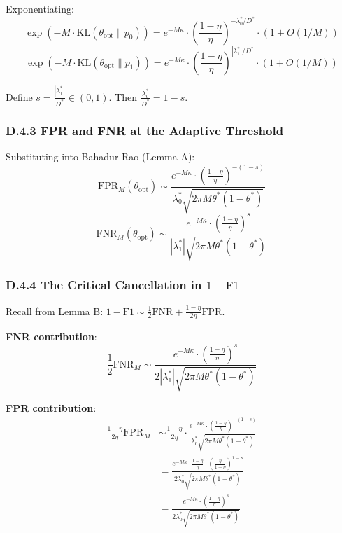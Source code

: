 \documentclass[
  12pt,
]{article}
\begin{document}
Exponentiating:
\[\exp(-M \cdot \text{KL}(\theta_{\text{opt}} \| p_0)) = e^{-M\kappa} \cdot \left(\frac{1-\eta}{\eta}\right)^{-\lambda_0^*/D^*} \cdot (1 + O(1/M))\]
\[\exp(-M \cdot \text{KL}(\theta_{\text{opt}} \| p_1)) = e^{-M\kappa} \cdot \left(\frac{1-\eta}{\eta}\right)^{|\lambda_1^*|/D^*} \cdot (1 + O(1/M))\]

Define \(s = \frac{|\lambda_1^*|}{D^*} \in (0,1)\). Then
\(\frac{\lambda_0^*}{D^*} = 1-s\).

\subsubsection{D.4.3 FPR and FNR at the Adaptive
Threshold}\label{d.4.3-fpr-and-fnr-at-the-adaptive-threshold}

Substituting into Bahadur-Rao (Lemma A):
\[\text{FPR}_M(\theta_{\text{opt}}) \sim \frac{e^{-M\kappa} \cdot \left(\frac{1-\eta}{\eta}\right)^{-(1-s)}}{\lambda_0^* \sqrt{2\pi M \theta^*(1-\theta^*)}}\]
\[\text{FNR}_M(\theta_{\text{opt}}) \sim \frac{e^{-M\kappa} \cdot \left(\frac{1-\eta}{\eta}\right)^{s}}{|\lambda_1^*| \sqrt{2\pi M \theta^*(1-\theta^*)}}\]

\subsubsection{\texorpdfstring{D.4.4 The Critical Cancellation in
\(1-\text{F1}\)}{D.4.4 The Critical Cancellation in 1-\textbackslash text\{F1\}}}\label{d.4.4-the-critical-cancellation-in-1-textf1}

Recall from Lemma B:
\(1 - \text{F1} \sim \frac{1}{2}\text{FNR} + \frac{1-\eta}{2\eta}\text{FPR}\).

\textbf{FNR contribution}:
\[\frac{1}{2}\text{FNR}_M \sim \frac{e^{-M\kappa} \cdot \left(\frac{1-\eta}{\eta}\right)^{s}}{2|\lambda_1^*| \sqrt{2\pi M \theta^*(1-\theta^*)}}\]

\textbf{FPR contribution}: \[\begin{aligned}
\frac{1-\eta}{2\eta}\text{FPR}_M &\sim \frac{1-\eta}{2\eta} \cdot \frac{e^{-M\kappa} \cdot \left(\frac{1-\eta}{\eta}\right)^{-(1-s)}}{\lambda_0^* \sqrt{2\pi M \theta^*(1-\theta^*)}} \\
&= \frac{e^{-M\kappa} \cdot \frac{1-\eta}{\eta} \cdot \left(\frac{\eta}{1-\eta}\right)^{1-s}}{2\lambda_0^* \sqrt{2\pi M \theta^*(1-\theta^*)}} \\
&= \frac{e^{-M\kappa} \cdot \left(\frac{1-\eta}{\eta}\right)^{s}}{2\lambda_0^* \sqrt{2\pi M \theta^*(1-\theta^*)}}
\end{aligned}\]
\end{document}
